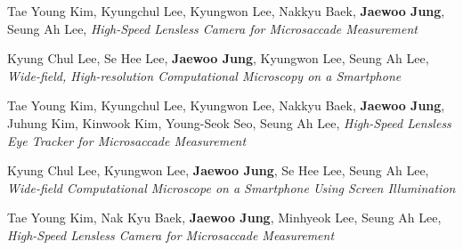 \documentclass[a4paper,12pt]{memoir} %
\begin{document}

{Tae Young Kim, Kyungchul Lee, Kyungwon Lee, Nakkyu Baek, \textbf{Jaewoo Jung}, Seung Ah Lee, \textit{High-Speed Lensless Camera for Microsaccade Measurement}}



{Kyung Chul Lee, Se Hee Lee, \textbf{Jaewoo Jung}, Kyungwon Lee, Seung Ah Lee, \textit{Wide-field, High-resolution Computational Microscopy on a Smartphone}}



{Tae Young Kim, Kyungchul Lee, Kyungwon Lee, Nakkyu Baek, \textbf{Jaewoo Jung}, Juhung Kim, Kinwook Kim, Young-Seok Seo, Seung Ah Lee, \textit{High-Speed Lensless Eye Tracker for Microsaccade Measurement}}



{Kyung Chul Lee, Kyungwon Lee, \textbf{Jaewoo Jung}, Se Hee Lee, Seung Ah Lee, \textit{Wide-field Computational Microscope on a Smartphone Using Screen Illumination}}


\clearpage %

\userinformation %

\framebreak %



{Tae Young Kim, Nak Kyu Baek, \textbf{Jaewoo Jung}, Minhyeok Lee, Seung Ah Lee, \textit{High-Speed Lensless Camera for Microsaccade Measurement}}


\Sep %
\end{document}
